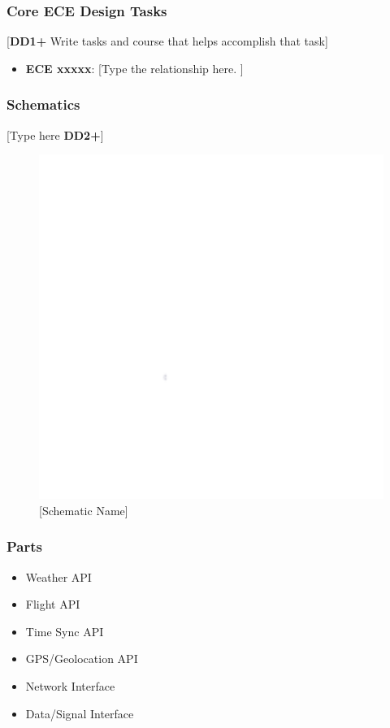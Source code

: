 \subsubsection{Core ECE Design Tasks}
[\textbf{DD1+} Write tasks and course that helps accomplish that task]
\begin{itemize}
    \item \textbf{ECE xxxxx}: [Type the relationship here. ]
\end{itemize}

\subsubsection{Schematics}
[Type here \textbf{DD2+}]
\begin{figure}[h]
    \centering
    \includegraphics[width=16cm]{images/white.png} %
    \caption{[Schematic Name]}
\end{figure} %

\subsubsection{Parts}
\begin{itemize}
    \item Weather API
    \item Flight API
    \item Time Sync API
    \item GPS/Geolocation API
    \item Network Interface
    \item Data/Signal Interface
\end{itemize}

